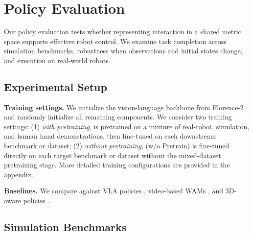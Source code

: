 \vspace{-0.3cm}

\section{Policy Evaluation}
\label{sec:experiments}
\label{sec:experiments:policy}
\vspace{-0.2cm}

Our policy evaluation tests whether representing interaction in a shared
metric space supports effective robot control. We examine task completion
across simulation benchmarks, robustness when observations and initial
states change, and execution on real-world robots.

\vspace{-0.2cm}

\subsection{Experimental Setup}
\label{sec:experiments:setup}
\vspace{-0.2cm}

\noindent\textbf{Training settings.}
We initialize the vision-language backbone from
Florence-2~\citep{xiao2023florence2} and randomly initialize all remaining
components. We consider two training settings: (1) \emph{with pretraining},
\method{} is pretrained on a mixture of real-robot, simulation, and
human hand demonstrations, then fine-tuned on each downstream benchmark
or dataset; (2) \emph{without pretraining}, \method{} (w/o Pretrain) is
fine-tuned directly on each target benchmark or dataset without the
mixed-dataset pretraining stage. More detailed training configurations
are provided in the appendix.

\noindent\textbf{Baselines.}
We compare against VLA policies
\citep{zheng2025xvla,sun2026vlajepa,black2024pizero,physicalintelligence2025pi05,abotm0},
video-based WAMs \citep{cosmospolicy,genieenvisioner,bi2025motus,li2026lingbotva,yuan2026fastwam}, and
3D-aware policies
\citep{qu2025spatialvla,wang2026lamp,guo2026xwam,zhou2026dexbev}.


\vspace{-0.2cm}

\subsection{Simulation Benchmarks}
\label{sec:experiments:simulation}
\vspace{-0.2cm}


